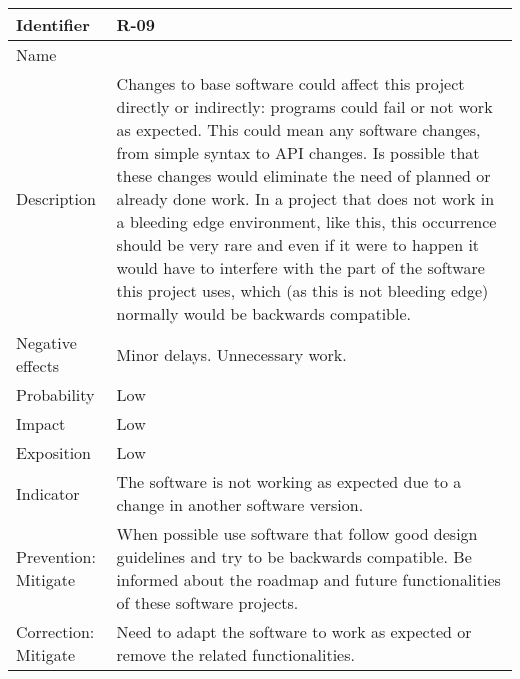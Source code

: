\begin{table}[H]
	\begin{tabularx}{\textwidth}{|y|z|}
		\hline
		Identifier & \textbf{R-09} \\ \hline
		Name & \Rnueve \\ \hline
		Description &
			Changes to base software could affect this project directly or indirectly: programs could fail or not work as expected. \linej
			This could mean any software changes, from simple syntax to API changes. \linej
			Is possible that these changes would eliminate the need of planned or already done work. \linej
			In a project that does not work in a bleeding edge environment, like this, this occurrence should be very rare and even if it were to happen it would have to interfere with the part of the software this project uses, which (as this is not bleeding edge) normally would be backwards compatible.
		\\ \hline
		Negative effects &
			Minor delays. \linej
			Unnecessary work.
		\\ \hline
		Probability & Low\\ \hline
		Impact & Low \\ \hline
		Exposition &  Low\\ \hline
		Indicator & The software is not working as expected due to a change in another software version.\\ \hline
		Prevention: Mitigate &
			When possible use software that follow good design guidelines and try to be backwards compatible. \linej
			Be informed about the roadmap and future functionalities of these software projects.
		\\ \hline
		Correction: Mitigate &
			Need to adapt the software to work as expected or remove the related functionalities.
		\\ \hline
	\end{tabularx}
\end{table}

